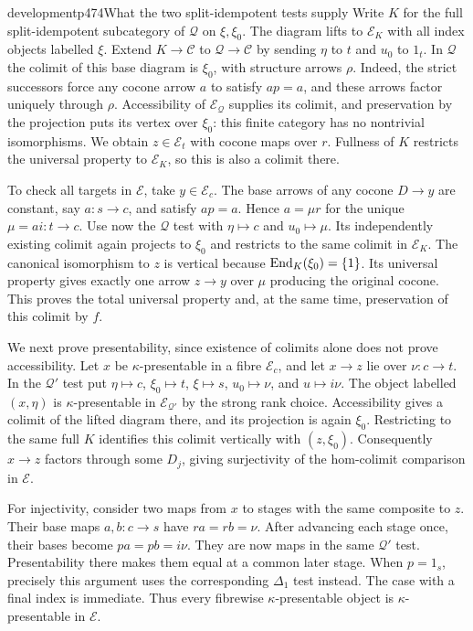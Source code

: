 \begin{dcomment}{development}{p474}{What the two split-idempotent tests supply}
Write $K$ for the full split-idempotent subcategory of $\mathcal Q$ on $\xi,\xi_0$. The diagram lifts to $\mathcal E_K$ with all index objects labelled $\xi$. Extend $K\to\mathcal C$ to $\mathcal Q\to\mathcal C$ by sending $\eta$ to $t$ and $u_0$ to $1_t$. In $\mathcal Q$ the colimit of this base diagram is $\xi_0$, with structure arrows $\rho$. Indeed, the strict successors force any cocone arrow $a$ to satisfy $ap=a$, and these arrows factor uniquely through $\rho$. Accessibility of $\mathcal E_{\mathcal Q}$ supplies its colimit, and preservation by the projection puts its vertex over $\xi_0$: this finite category has no nontrivial isomorphisms. We obtain $z\in\mathcal E_t$ with cocone maps over $r$. Fullness of $K$ restricts the universal property to $\mathcal E_K$, so this is also a colimit there.

To check all targets in $\mathcal E$, take $y\in\mathcal E_c$. The base arrows of any cocone $D\to y$ are constant, say $a:s\to c$, and satisfy $ap=a$. Hence $a=\mu r$ for the unique $\mu=ai:t\to c$. Use now the $\mathcal Q$ test with $\eta\mapsto c$ and $u_0\mapsto\mu$. Its independently existing colimit again projects to $\xi_0$ and restricts to the same colimit in $\mathcal E_K$. The canonical isomorphism to $z$ is vertical because $\operatorname{End}_K(\xi_0)=\{1\}$. Its universal property gives exactly one arrow $z\to y$ over $\mu$ producing the original cocone. This proves the total universal property and, at the same time, preservation of this colimit by $f$.

We next prove presentability, since existence of colimits alone does not prove accessibility. Let $x$ be $\kappa$-presentable in a fibre $\mathcal E_c$, and let $x\to z$ lie over $\nu:c\to t$. In the $\mathcal Q'$ test put $\eta\mapsto c$, $\xi_0\mapsto t$, $\xi\mapsto s$, $u_0\mapsto\nu$, and $u\mapsto i\nu$. The object labelled $(x,\eta)$ is $\kappa$-presentable in $\mathcal E_{\mathcal Q'}$ by the strong rank choice. Accessibility gives a colimit of the lifted diagram there, and its projection is again $\xi_0$. Restricting to the same full $K$ identifies this colimit vertically with $(z,\xi_0)$. Consequently $x\to z$ factors through some $D_j$, giving surjectivity of the hom-colimit comparison in $\mathcal E$.

For injectivity, consider two maps from $x$ to stages with the same composite to $z$. Their base maps $a,b:c\to s$ have $ra=rb=\nu$. After advancing each stage once, their bases become $pa=pb=i\nu$. They are now maps in the same $\mathcal Q'$ test. Presentability there makes them equal at a common later stage. When $p=1_s$, precisely this argument uses the corresponding $\Delta_1$ test instead. The case with a final index is immediate. Thus every fibrewise $\kappa$-presentable object is $\kappa$-presentable in $\mathcal E$.


\end{dcomment}
